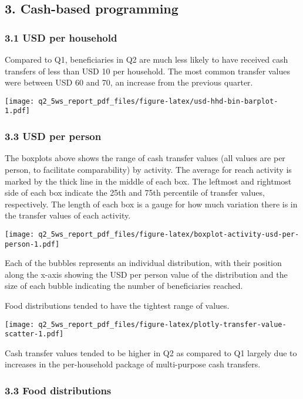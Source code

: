 \documentclass[
]{article}
\begin{document}
\hypertarget{cash-based-programming}{%
\subsection{3. Cash-based programming}\label{cash-based-programming}}

\hypertarget{usd-per-household}{%
\subsubsection{3.1 USD per household}\label{usd-per-household}}

Compared to Q1, beneficiaries in Q2 are much less likely to have
received cash transfers of less than USD 10 per household. The most
common transfer values were between USD 60 and 70, an increase from the
previous quarter.

\texttt{[image: q2\_5ws\_report\_pdf\_files/figure-latex/usd-hhd-bin-barplot-1.pdf]}

\hypertarget{usd-per-person}{%
\subsubsection{3.3 USD per person}\label{usd-per-person}}

The boxplots above shows the range of cash transfer values (all values
are per person, to facilitate comparability) by activity. The average
for reach activity is marked by the thick line in the middle of each
box. The leftmost and rightmost side of each box indicate the 25th and
75th percentile of transfer values, respectively. The length of each box
is a gauge for how much variation there is in the transfer values of
each activity.

\texttt{[image: q2\_5ws\_report\_pdf\_files/figure-latex/boxplot-activity-usd-per-person-1.pdf]}

Each of the bubbles represents an individual distribution, with their
position along the x-axis showing the USD per person value of the
distribution and the size of each bubble indicating the number of
beneficiaries reached.

Food distributions tended to have the tightest range of values.

\texttt{[image: q2\_5ws\_report\_pdf\_files/figure-latex/plotly-transfer-value-scatter-1.pdf]}

Cash transfer values tended to be higher in Q2 as compared to Q1 largely
due to increases in the per-household package of multi-purpose cash
transfers.

\hypertarget{food-distributions}{%
\subsubsection{3.3 Food distributions}\label{food-distributions}}
\end{document}
